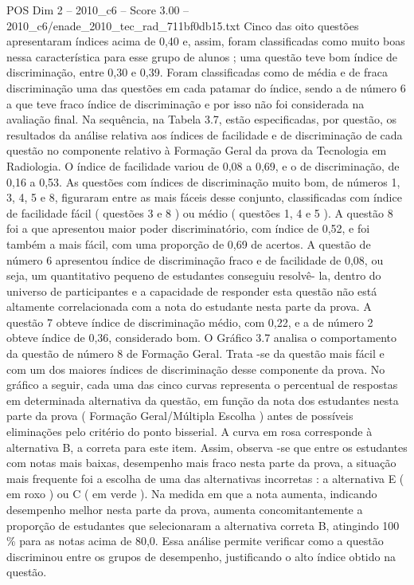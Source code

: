 \begin{textsample}{POS Dim 2 – 2010\_c6 – Score 3.00 – 2010\_c6/enade\_2010\_tec\_rad\_711bf0db15.txt}
Cinco das oito questões apresentaram índices acima de 0,40 e, assim, foram classificadas como muito boas nessa característica para esse grupo de alunos ; uma questão teve bom índice de discriminação, entre 0,30 e 0,39.
Foram classificadas como de média e de fraca discriminação uma das questões em cada patamar do índice, sendo a de número 6 a que teve fraco índice de discriminação e por isso não foi considerada na avaliação final.
Na sequência, na Tabela 3.7, estão especificadas, por questão, os resultados da análise relativa aos índices de facilidade e de discriminação de cada questão no componente relativo à Formação Geral da prova da Tecnologia em Radiologia.
O índice de facilidade variou de 0,08 a 0,69, e o de discriminação, de 0,16 a 0,53.
As questões com índices de discriminação muito bom, de números 1, 3, 4, 5 e 8, figuraram entre as mais fáceis desse conjunto, classificadas com índice de facilidade fácil ( questões 3 e 8 ) ou médio ( questões 1, 4 e 5 ).
A questão 8 foi a que apresentou maior poder discriminatório, com índice de 0,52, e foi também a mais fácil, com uma proporção de 0,69 de acertos.
A questão de número 6 apresentou índice de discriminação fraco e de facilidade de 0,08, ou seja, um quantitativo pequeno de estudantes conseguiu resolvê- la, dentro do universo de participantes e a capacidade de responder esta questão não está altamente correlacionada com a nota do estudante nesta parte da prova.
A questão 7 obteve índice de discriminação médio, com 0,22, e a de número 2 obteve índice de 0,36, considerado bom.
O Gráfico 3.7 analisa o comportamento da questão de número 8 de Formação Geral.
Trata -se da questão mais fácil e com um dos maiores índices de discriminação desse componente da prova.
No gráfico a seguir, cada uma das cinco curvas representa o percentual de respostas em determinada alternativa da questão, em função da nota dos estudantes nesta parte da prova ( Formação Geral/Múltipla Escolha ) antes de possíveis eliminações pelo critério do ponto bisserial.
A curva em rosa corresponde à alternativa B, a correta para este item.
Assim, observa -se que entre os estudantes com notas mais baixas, desempenho mais fraco nesta parte da prova, a situação mais frequente foi a escolha de uma das alternativas incorretas : a alternativa E ( em roxo ) ou C ( em verde ).
Na medida em que a nota aumenta, indicando desempenho melhor nesta parte da prova, aumenta concomitantemente a proporção de estudantes que selecionaram a alternativa correta B, atingindo 100 \% para as notas acima de 80,0.
Essa análise permite verificar como a questão discriminou entre os grupos de desempenho, justificando o alto índice obtido na questão.

\end{textsample}
